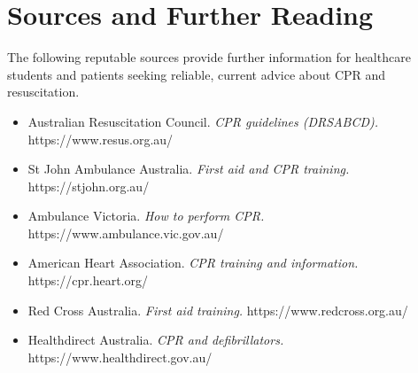 \section*{Sources and Further Reading}
The following reputable sources provide further information for healthcare students and patients seeking reliable, current advice about CPR and resuscitation.

\begin{itemize}
    \item Australian Resuscitation Council. \textit{CPR guidelines (DRSABCD).} https://www.resus.org.au/
    \item St John Ambulance Australia. \textit{First aid and CPR training.} https://stjohn.org.au/
    \item Ambulance Victoria. \textit{How to perform CPR.} https://www.ambulance.vic.gov.au/
    \item American Heart Association. \textit{CPR training and information.} https://cpr.heart.org/
    \item Red Cross Australia. \textit{First aid training.} https://www.redcross.org.au/
    \item Healthdirect Australia. \textit{CPR and defibrillators.} https://www.healthdirect.gov.au/
\end{itemize}
